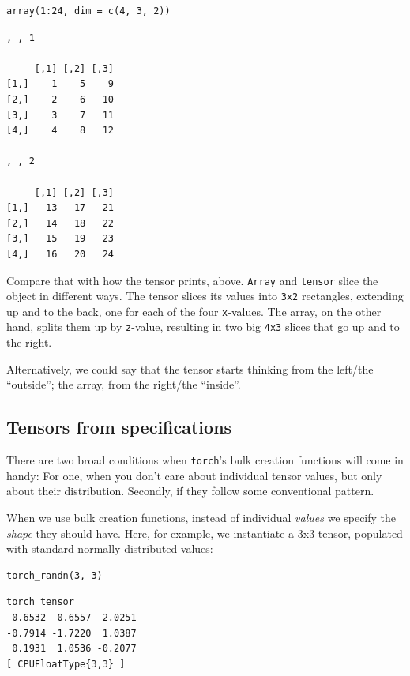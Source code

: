 \documentclass[
  letterpaper,
]{krantz}
\begin{document}
\begin{verbatim}
array(1:24, dim = c(4, 3, 2))
\end{verbatim}

\begin{verbatim}
, , 1

     [,1] [,2] [,3]
[1,]    1    5    9
[2,]    2    6   10
[3,]    3    7   11
[4,]    4    8   12

, , 2

     [,1] [,2] [,3]
[1,]   13   17   21
[2,]   14   18   22
[3,]   15   19   23
[4,]   16   20   24
\end{verbatim}

Compare that with how the tensor prints, above. \texttt{Array} and
\texttt{tensor} slice the object in different ways. The tensor slices
its values into \texttt{3x2} rectangles, extending up and to the back,
one for each of the four \texttt{x}-values. The array, on the other
hand, splits them up by \texttt{z}-value, resulting in two big
\texttt{4x3} slices that go up and to the right.

Alternatively, we could say that the tensor starts thinking from the
left/the ``outside''; the array, from the right/the ``inside''.

\hypertarget{tensors-from-specifications}{%
\subsection{\texorpdfstring{Tensors from
specifications}{Tensors from specifications}}\label{tensors-from-specifications}}

There are two broad conditions when \texttt{torch}'s bulk creation
functions will come in handy: For one, when you don't care about
individual tensor values, but only about their distribution. Secondly,
if they follow some conventional pattern.

When we use bulk creation functions, instead of individual \emph{values}
we specify the \emph{shape} they should have. Here, for example, we
instantiate a 3x3 tensor, populated with standard-normally distributed
values:

\begin{verbatim}
torch_randn(3, 3)
\end{verbatim}

\begin{verbatim}
torch_tensor
-0.6532  0.6557  2.0251
-0.7914 -1.7220  1.0387
 0.1931  1.0536 -0.2077
[ CPUFloatType{3,3} ]
\end{verbatim}
\end{document}
